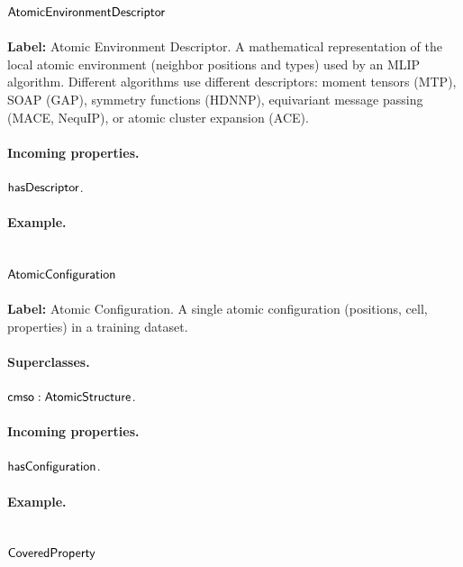 \subsection{$\mathsf{AtomicEnvironmentDescriptor}$}
\label{sec:term-AtomicEnvironmentDescriptor}

\textbf{Label:} Atomic Environment Descriptor.
A mathematical representation of the local atomic environment (neighbor positions and types) used by an MLIP algorithm. Different algorithms use different descriptors: moment tensors (MTP), SOAP (GAP), symmetry functions (HDNNP), equivariant message passing (MACE, NequIP), or atomic cluster expansion (ACE).

\paragraph{Incoming properties.} $\mathsf{hasDescriptor}$.

\paragraph{Example.}

\subsection{$\mathsf{AtomicConfiguration}$}
\label{sec:term-AtomicConfiguration}

\textbf{Label:} Atomic Configuration.
A single atomic configuration (positions, cell, properties) in a training dataset.

\paragraph{Superclasses.} $\mathsf{cmso:AtomicStructure}$.

\paragraph{Incoming properties.} $\mathsf{hasConfiguration}$.

\paragraph{Example.}

\subsection{$\mathsf{CoveredProperty}$}
\label{sec:term-CoveredProperty}

